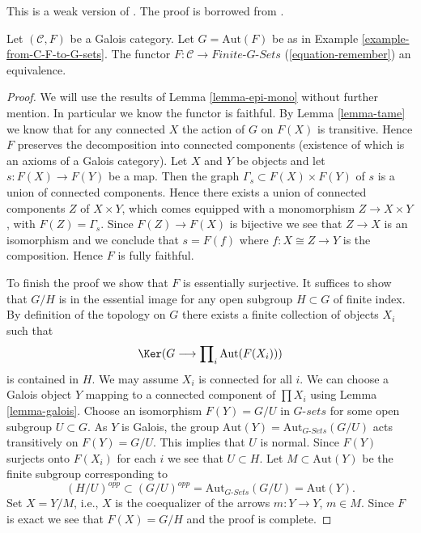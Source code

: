 \begin{proposition}
\label{proposition-galois}
\begin{reference}
This is a weak version of \cite[Expos\'e V]{SGA1}.
The proof is borrowed from \cite[Theorem 7.2.5]{BS}.
\end{reference}
Let $(\mathcal{C}, F)$ be a Galois category. Let $G = \text{Aut}(F)$
be as in Example \ref{example-from-C-F-to-G-sets}. The functor
$F : \mathcal{C} \to \textit{Finite-}G\textit{-Sets}$
(\ref{equation-remember}) an equivalence.
\end{proposition}

\begin{proof}
We will use the results of Lemma \ref{lemma-epi-mono} without further mention.
In particular we know the functor is faithful.
By Lemma \ref{lemma-tame} we know that for any connected $X$ the
action of $G$ on $F(X)$ is transitive. Hence $F$ preserves
the decomposition into connected components (existence of which is
an axioms of a Galois category). Let $X$ and $Y$ be objects and let
$s : F(X) \to F(Y)$ be a map. Then the graph
$\Gamma_s \subset F(X) \times F(Y)$ of $s$
is a union of connected components. Hence there exists a
union of connected components $Z$ of $X \times Y$,
which comes equipped with a monomorphism $Z \to X \times Y$,
with $F(Z) = \Gamma_s$. Since $F(Z) \to F(X)$ is bijective
we see that $Z \to X$ is an isomorphism and we conclude
that $s = F(f)$ where $f : X \cong Z \to Y$ is the composition.
Hence $F$ is fully faithful.

\medskip\noindent
To finish the proof we show that $F$ is essentially surjective.
It suffices to show that $G/H$ is in the essential image for
any open subgroup $H \subset G$ of finite index.
By definition of the topology on $G$ there exists a finite
collection of objects $X_i$ such that
$$
\Ker(G \longrightarrow \prod\nolimits_i \text{Aut}(F(X_i)))
$$
is contained in $H$. We may assume $X_i$ is connected
for all $i$. We can choose a Galois object $Y$ mapping
to a connected component of $\prod X_i$ using
Lemma \ref{lemma-galois}. Choose an isomorphism $F(Y) = G/U$
in $G\textit{-sets}$ for some open subgroup $U \subset G$.
As $Y$ is Galois, the group
$\text{Aut}(Y) = \text{Aut}_{G\textit{-Sets}}(G/U)$ acts transitively
on $F(Y) = G/U$. This implies that $U$ is normal. Since
$F(Y)$ surjects onto $F(X_i)$ for each $i$ we see that
$U \subset H$. Let $M \subset \text{Aut}(Y)$ be the finite subgroup
corresponding to
$$
(H/U)^{opp} \subset (G/U)^{opp} = \text{Aut}_{G\textit{-Sets}}(G/U)
= \text{Aut}(Y).
$$
Set $X = Y/M$, i.e., $X$ is the coequalizer
of the arrows $m : Y \to Y$, $m \in M$.
Since $F$ is exact we see that $F(X) = G/H$ and the
proof is complete.
\end{proof}

